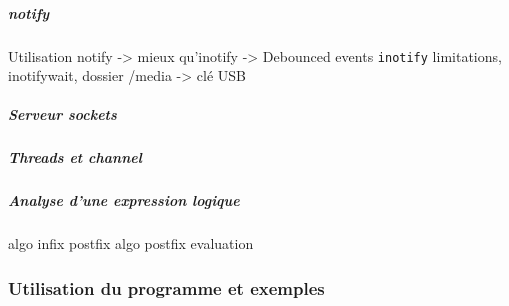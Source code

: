 \subparagraph{notify}\label{tag_engine_notify}
Utilisation notify -> mieux qu'inotify -> Debounced events
\texttt{inotify} limitations, inotifywait, dossier /media -> clé USB

\subparagraph{Serveur sockets}\label{tag_engine_socket}

\subparagraph{Threads et \textit{channel}}\label{tag_engine_main}

\subparagraph{Analyse d'une expression logique}\label{tag_engine_parse}
algo infix postfix \cite{ref40}
algo postfix evaluation \cite{ref41}

\subsubsection{Utilisation du programme et exemples}
